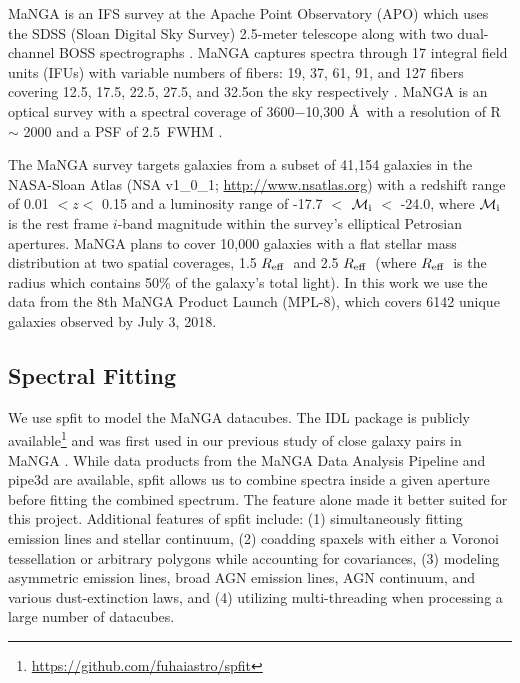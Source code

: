 \documentclass[apj,twocolumn]{emulateapj}
\newcommand{\reff}{$R_{\rm eff}$}
\begin{document}
\begin{CJK*}{UTF8}{gbsn}
MaNGA is an IFS survey at the Apache Point Observatory (APO) which uses the SDSS (Sloan Digital Sky Survey) 2.5-meter telescope along with two dual-channel BOSS spectrographs \citep{Drory:2015}. MaNGA captures spectra through 17 integral field units (IFUs) with variable numbers of fibers: 19, 37, 61, 91, and 127 fibers covering 12.5\arcsec, 17.5\arcsec, 22.5\arcsec, 27.5\arcsec, and 32.5\arcsec on the sky respectively \citep{Law:2015}. MaNGA is an optical survey with a spectral coverage of 3600$-$10,300 \AA\ with a resolution of R $\sim$ 2000 and a PSF of 2.5\arcsec\ FWHM \citep{Bundy:2015}. 

The MaNGA survey targets galaxies from a subset of 41,154 galaxies in the NASA-Sloan Atlas (NSA v1\_0\_1; \url{http://www.nsatlas.org}) with a redshift range of 0.01 $< z <$ 0.15 and a luminosity range of -17.7 $<$ $\mathcal{M}_{\rm i}$ $<$ -24.0, where $\mathcal{M}_{\rm i}$ is the rest frame $i$-band magnitude within the survey's elliptical Petrosian apertures. MaNGA plans to cover 10,000 galaxies with a flat stellar mass distribution at two spatial coverages, 1.5 \reff\ and 2.5 \reff\ (where \reff\ is the radius which contains 50\% of the galaxy's total light). In this work we use the data from the 8th MaNGA Product Launch (MPL-8), which covers 6142 unique galaxies observed by July 3, 2018. 

\subsection{Spectral Fitting}\label{sec:spfit}

We use {\sc spfit} to model the MaNGA datacubes. The IDL package is publicly available\footnote{\url{https://github.com/fuhaiastro/spfit}} and was first used in our previous study of close galaxy pairs in MaNGA . While data products from the MaNGA Data Analysis Pipeline \citep[DAP;][]{Belfiore:2019} and {\sc pipe3d} \citep{Sanchez:2016a, Sanchez:2016b} are available, {\sc spfit} allows us to combine spectra inside a given aperture before fitting the combined spectrum. The feature alone made it better suited for this project. Additional features of {\sc spfit} include: (1) simultaneously fitting emission lines and stellar continuum, (2) coadding spaxels with either a Voronoi tessellation or arbitrary polygons while accounting for covariances, (3) modeling asymmetric emission lines, broad AGN emission lines, AGN continuum, and various dust-extinction laws, and (4) utilizing multi-threading when processing a large number of datacubes.


\end{CJK*}
\end{document}
